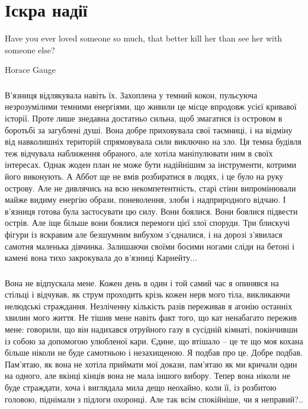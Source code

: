\documentclass[a4paper,oneside]{book}
\begin{document}
\part{Іскра надії}

\setcounter{chapter}{3}

\epigraph{Have you ever loved someone so much, that better kill her than see
  her with someone else?}{Horace Gauge}

\section*{}

В’язниця відлякувала навіть їх. Захоплена у темний кокон, пульсуюча
незрозумілими темними енергіями, що живили це місце впродовж усієї кривавої
історії. Проте лише  знедавна достатньо сильна, щоб змагатися із островом в
боротьбі за загублені душі. Вона добре приховувала свої таємниці, і на відміну
від навколишніх територій спрямовувала сили виключно на зло. Ця темна будівля
теж відчувала наближення обраного, але хотіла маніпулювати ним в своїх
інтересах. Однак жоден план не може бути надійнішим за інструменти, котрими
його виконують. А Аббот ще не вмів розбиратися в людях, і це було на руку
острову. Але не дивлячись на  всю некомпетентність, старі стіни випромінювали
майже видиму енергію образи, поневолення, злоби і надприродного відчаю. І
в’язниця готова була застосувати цю силу. Вони боялися. Вони боялися підвести
острів. Але іще більше вони боялися перемоги цієї злої споруди. Три блискучі
фігури із яскравим але безшумним вибухом з’єдналися, і на дорозі з’явилася
самотня маленька дівчинка. Залишаючи своїми босими ногами сліди на бетоні і
камені вона тихо закрокувала до в’язниці Карнейту...

\section*{} 
 
Вона не відпускала мене. Кожен день в один і той самий час я опинявся на
стільці і відчував, як струм проходить крізь кожен нерв мого тіла, викликаючи
нелюдські страждання. Незліченну кількість разів переживав я агонію останніх
хвилин мого життя. Не тішив мене навіть факт того, що кат ненабагато пережив
мене: говорили, що він надихався отруйного газу в сусідній кімнаті, покінчивши
із собою за допомогою улюбленої кари. Єдине, що втішало – це те що моя кохана
більше ніколи не буде самотньою і незахищеною. Я подбав про це. Добре
подбав. Пам’ятаю, як вона не хотіла приймати мої докази, пам’ятаю як ми
кричали один на одного, але вкінці кінців вона не мала іншого вибору. Тепер
вона ніколи не буде страждати, хоча і виглядала мила дещо неохайно, коли її,
із розбитою головою, піднімали з підлоги охоронці. Але так всім спокійніше, чи
я неправий?..
\end{document}
